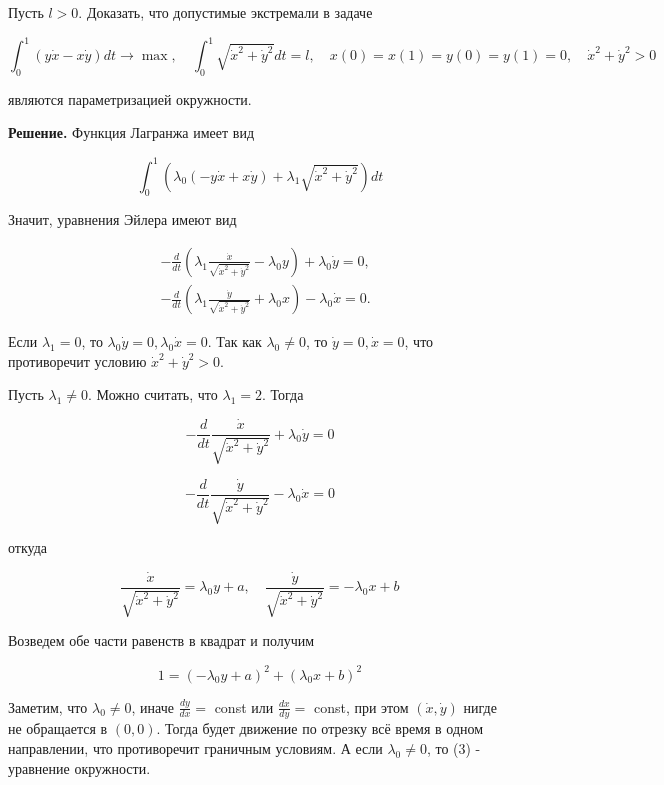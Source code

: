 \begin{task}
Пусть $l>0$. Доказать, что допустимые экстремали в задаче

$$
\int_{0}^{1}(y \dot{x}-x \dot{y}) d t \rightarrow \max , \quad \int_{0}^{1} \sqrt{\dot{x}^{2}+\dot{y}^{2}} d t=l, \quad x(0)=x(1)=y(0)=y(1)=0, \quad \dot{x}^{2}+\dot{y}^{2}>0
$$

являются параметризацией окружности.

\textbf{Решение.} Функция Лагранжа имеет вид

$$
\int_{0}^{1}\left(\lambda_{0}(-y \dot{x}+x \dot{y})+\lambda_{1} \sqrt{\dot{x}^{2}+\dot{y}^{2}}\right) d t
$$

Значит, уравнения Эйлера имеют вид

$$
\begin{aligned}
& -\frac{d}{d t}\left(\lambda_{1} \frac{\dot{x}}{\sqrt{\dot{x}^{2}+\dot{y}^{2}}}-\lambda_{0} y\right)+\lambda_{0} \dot{y}=0, \\
& -\frac{d}{d t}\left(\lambda_{1} \frac{\dot{y}}{\sqrt{\dot{x}^{2}+\dot{y}^{2}}}+\lambda_{0} x\right)-\lambda_{0} \dot{x}=0 .
\end{aligned}
$$

Если $\lambda_{1}=0$, то $\lambda_{0} \dot{y}=0, \lambda_{0} \dot{x}=0$. Так как $\lambda_{0} \neq 0$, то $\dot{y}=0, \dot{x}=0$, что противоречит условию $\dot{x}^{2}+\dot{y}^{2}>0$.

Пусть $\lambda_{1} \neq 0$. Можно считать, что $\lambda_{1}=2$. Тогда

$$
-\frac{d}{d t} \frac{\dot{x}}{\sqrt{\dot{x}^{2}+\dot{y}^{2}}}+\lambda_{0} \dot{y}=0
$$

$$
-\frac{d}{d t} \frac{\dot{y}}{\sqrt{\dot{x}^{2}+\dot{y}^{2}}}-\lambda_{0} \dot{x}=0
$$

откуда

$$
\frac{\dot{x}}{\sqrt{\dot{x}^{2}+\dot{y}^{2}}}=\lambda_{0} y+a, \quad \frac{\dot{y}}{\sqrt{\dot{x}^{2}+\dot{y}^{2}}}=-\lambda_{0} x+b
$$

Возведем обе части равенств в квадрат и получим

$$
1=\left(-\lambda_{0} y+a\right)^{2}+\left(\lambda_{0} x+b\right)^{2}
$$

Заметим, что $\lambda_{0} \neq 0$, иначе $\frac{d y}{d x}=$ const или $\frac{d x}{d y}=$ const, при этом $(\dot{x}, \dot{y})$ нигде не обращается в $(0,0)$. Тогда будет движение по отрезку всё время в одном направлении, что противоречит граничным условиям. А если $\lambda_{0} \neq 0$, то (3) - уравнение окружности.
\end{task}